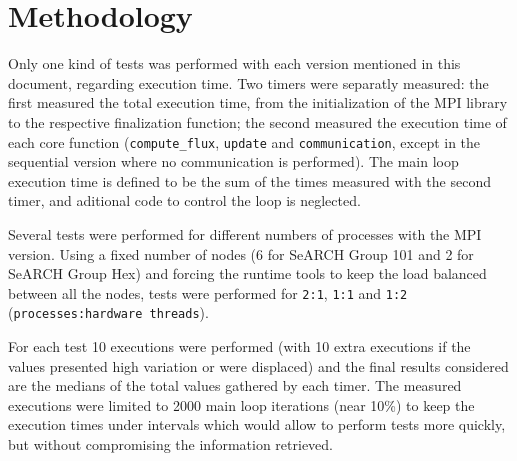 \section{Methodology}
\label{sec:methodology}

Only one kind of tests was performed with each version mentioned in this document, regarding execution time. Two timers were separatly measured: the first measured the total execution time, from the initialization of the MPI library to the respective finalization function; the second measured the execution time of each core function (\texttt{compute\_flux}, \texttt{update} and \texttt{communication}, except in the sequential version where no communication is performed). The main loop execution time is defined to be the sum of the times measured with the second timer, and aditional code to control the loop is neglected.

Several tests were performed for different numbers of processes with the MPI version. Using a fixed number of nodes (6 for SeARCH Group 101 and 2 for SeARCH Group Hex) and forcing the runtime tools to keep the load balanced between all the nodes, tests were performed for \texttt{2:1}, \texttt{1:1} and \texttt{1:2} (\texttt{processes:hardware threads}).

For each test 10 executions were performed (with 10 extra executions if the values presented high variation or were displaced) and the final results considered are the medians of the total values gathered by each timer. The measured executions were limited to 2000 main loop iterations (near 10\%) to keep the execution times under intervals which would allow to perform tests more quickly, but without compromising the information retrieved.
